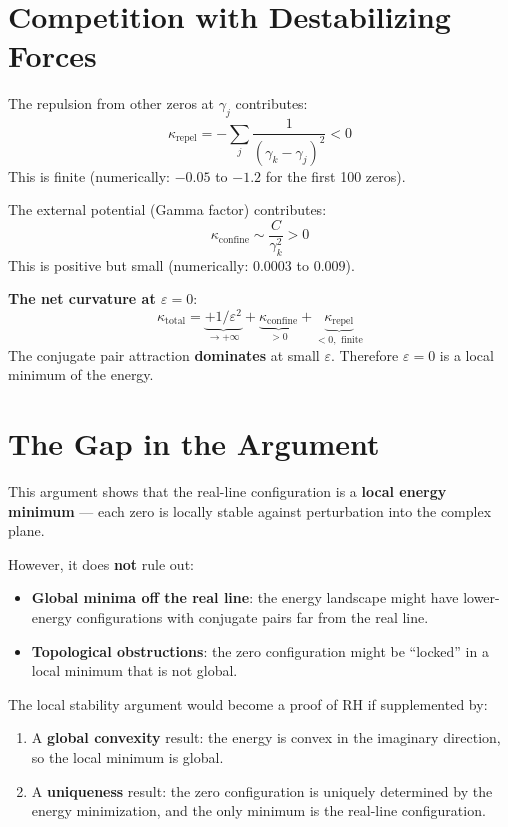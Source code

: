 \documentclass[11pt]{article}
\begin{document}
\section{Competition with Destabilizing Forces}

The repulsion from other zeros at $\gamma_j$ contributes:
\[
\kappa_{\mathrm{repel}} = -\sum_{j} \frac{1}{(\gamma_k - \gamma_j)^2} < 0
\]
This is finite (numerically: $-0.05$ to $-1.2$ for the first 100 zeros).

The external potential (Gamma factor) contributes:
\[
\kappa_{\mathrm{confine}} \sim \frac{C}{\gamma_k^2} > 0
\]
This is positive but small (numerically: $0.0003$ to $0.009$).

\textbf{The net curvature at $\varepsilon = 0$}:
\[
\kappa_{\mathrm{total}} = \underbrace{+1/\varepsilon^2}_{\to +\infty} + \underbrace{\kappa_{\mathrm{confine}}}_{> 0} + \underbrace{\kappa_{\mathrm{repel}}}_{< 0, \text{ finite}}
\]
The conjugate pair attraction \textbf{dominates} at small $\varepsilon$. Therefore $\varepsilon = 0$ is a local minimum of the energy.

\section{The Gap in the Argument}

This argument shows that the real-line configuration is a \textbf{local energy minimum} --- each zero is locally stable against perturbation into the complex plane.

However, it does \textbf{not} rule out:
\begin{itemize}
\item \textbf{Global minima off the real line}: the energy landscape might have lower-energy configurations with conjugate pairs far from the real line.
\item \textbf{Topological obstructions}: the zero configuration might be ``locked'' in a local minimum that is not global.
\end{itemize}

The local stability argument would become a proof of RH if supplemented by:
\begin{enumerate}
\item A \textbf{global convexity} result: the energy is convex in the imaginary direction, so the local minimum is global.
\item A \textbf{uniqueness} result: the zero configuration is uniquely determined by the energy minimization, and the only minimum is the real-line configuration.
\end{enumerate}
\end{document}
